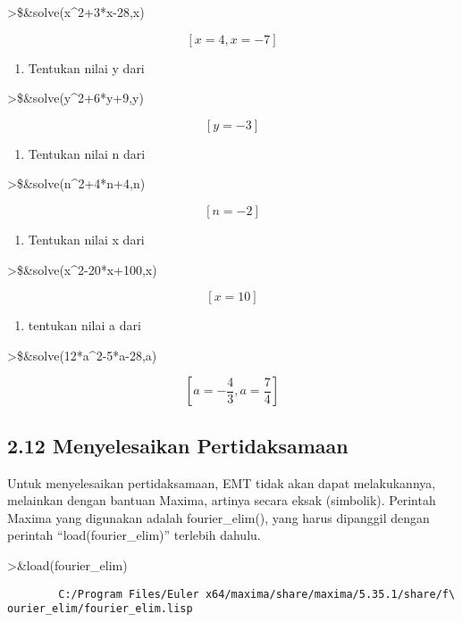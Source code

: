 \documentclass[
]{book}
\providecommand{\tightlist}{%
  \setlength{\itemsep}{0pt}\setlength{\parskip}{0pt}}
\begin{document}
\textgreater\$\&solve(x\^{}2+3*x-28,x)

\[\left[ x=4 , x=-7 \right]\]

\begin{enumerate}
\def\labelenumi{\arabic{enumi}.}
\setcounter{enumi}{1}
\tightlist
\item
  Tentukan nilai y dari
\end{enumerate}

\textgreater\$\&solve(y\^{}2+6*y+9,y)

\[\left[ y=-3 \right]\]

\begin{enumerate}
\def\labelenumi{\arabic{enumi}.}
\setcounter{enumi}{2}
\tightlist
\item
  Tentukan nilai n dari
\end{enumerate}

\textgreater\$\&solve(n\^{}2+4*n+4,n)

\[\left[ n=-2 \right]\]

\begin{enumerate}
\def\labelenumi{\arabic{enumi}.}
\setcounter{enumi}{3}
\tightlist
\item
  Tentukan nilai x dari
\end{enumerate}

\textgreater\$\&solve(x\^{}2-20*x+100,x)

\[\left[ x=10 \right]\]

\begin{enumerate}
\def\labelenumi{\arabic{enumi}.}
\setcounter{enumi}{4}
\tightlist
\item
  tentukan nilai a dari
\end{enumerate}

\textgreater\$\&solve(12*a\^{}2-5*a-28,a)

\[\left[ a=-\frac{4}{3} , a=\frac{7}{4} \right]\]

\subsection{2.12 Menyelesaikan Pertidaksamaan}\label{menyelesaikan-pertidaksamaan}

Untuk menyelesaikan pertidaksamaan, EMT tidak akan dapat melakukannya, melainkan dengan bantuan Maxima, artinya secara eksak (simbolik). Perintah Maxima yang digunakan adalah fourier\_elim(), yang harus dipanggil dengan perintah ``load(fourier\_elim)'' terlebih dahulu.

\textgreater\&load(fourier\_elim)

\begin{verbatim}
        C:/Program Files/Euler x64/maxima/share/maxima/5.35.1/share/f\
ourier_elim/fourier_elim.lisp
\end{verbatim}
\end{document}
